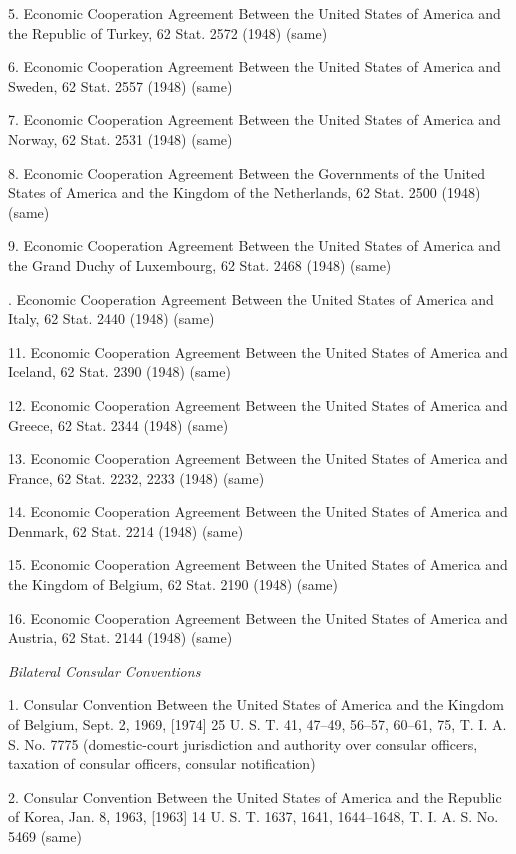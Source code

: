     5. Economic Cooperation Agreement Between the United States of
    America and the Republic of Turkey, 62 Stat. 2572 (1948) (same)

    6. Economic Cooperation Agreement Between the United States of
    America and Sweden, 62 Stat. 2557 (1948) (same)

    7. Economic Cooperation Agreement Between the United States of
    America and Norway, 62 Stat. 2531 (1948) (same)

    8. Economic Cooperation Agreement Between the Governments of the
    United States of America and the Kingdom of the Netherlands, 62
    Stat. 2500 (1948) (same)

    9. Economic Cooperation Agreement Between the United States of
    America and the Grand Duchy of Luxembourg, 62 Stat. 2468 (1948)
    (same)

    . Economic Cooperation Agreement Between the United
    States of America and Italy, 62 Stat. 2440 (1948) (same)

    11. Economic Cooperation Agreement Between the United States of
    America and Iceland, 62 Stat. 2390 (1948) (same)

    12. Economic Cooperation Agreement Between the United States of
    America and Greece, 62 Stat. 2344 (1948) (same)

    13. Economic Cooperation Agreement Between the United States of
    America and France, 62 Stat. 2232, 2233 (1948) (same)

    14. Economic Cooperation Agreement Between the United States of
    America and Denmark, 62 Stat. 2214 (1948) (same)

    15. Economic Cooperation Agreement Between the United States of
    America and the Kingdom of Belgium, 62 Stat. 2190 (1948) (same)

    16. Economic Cooperation Agreement Between the United States of
    America and Austria, 62 Stat. 2144 (1948) (same)

\emph{Bilateral Consular Conventions}

    1. Consular Convention Between the United States of America and
    the Kingdom of Belgium, Sept. 2, 1969, [1974] 25 U. S. T. 41,
    47--49, 56--57, 60--61, 75, T. I. A. S. No. 7775 (domestic-court
    jurisdiction and authority over consular officers, taxation of
    consular officers, consular notification)

    2. Consular Convention Between the United States of America and
    the Republic of Korea, Jan. 8, 1963, [1963] 14 U. S. T. 1637, 1641,
    1644--1648, T. I. A. S. No. 5469 (same)

